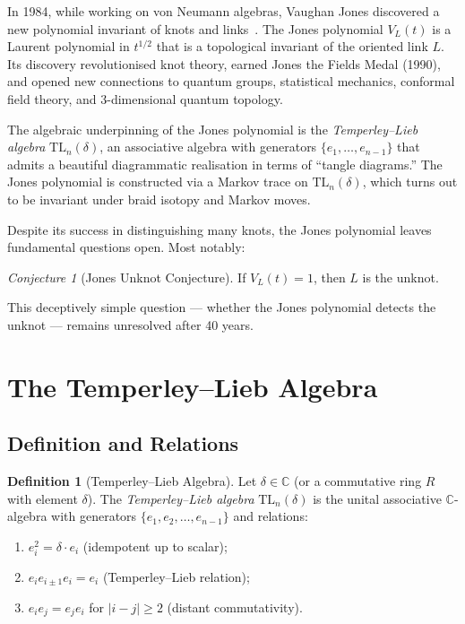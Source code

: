 \documentclass[12pt,a4paper]{amsart}
\theoremstyle{definition}
\newtheorem{definition}[theorem]{Definition}
\theoremstyle{remark}
\newtheorem{conjecture}[theorem]{Conjecture}
\begin{document}
In 1984, while working on von Neumann algebras, Vaughan Jones discovered
a new polynomial invariant of knots and links~\cite{Jones1985}. The Jones
polynomial $V_L(t)$ is a Laurent polynomial in $t^{1/2}$ that is a
topological invariant of the oriented link $L$. Its discovery revolutionised
knot theory, earned Jones the Fields Medal (1990), and opened new connections
to quantum groups, statistical mechanics, conformal field theory, and
3-dimensional quantum topology.

The algebraic underpinning of the Jones polynomial is the
\emph{Temperley--Lieb algebra} $\mathrm{TL}_n(\delta)$, an associative
algebra with generators $\{e_1, \ldots, e_{n-1}\}$ that admits a beautiful
diagrammatic realisation in terms of ``tangle diagrams.'' The Jones
polynomial is constructed via a Markov trace on $\mathrm{TL}_n(\delta)$,
which turns out to be invariant under braid isotopy and Markov moves.

Despite its success in distinguishing many knots, the Jones polynomial
leaves fundamental questions open. Most notably:

\begin{conjecture}[Jones Unknot Conjecture]
\label{conj:Jones-unknot}
If $V_L(t) = 1$, then $L$ is the unknot.
\end{conjecture}

This deceptively simple question — whether the Jones polynomial detects the
unknot — remains unresolved after 40 years.

\section{The Temperley--Lieb Algebra}

\subsection{Definition and Relations}

\begin{definition}[Temperley--Lieb Algebra]
Let $\delta \in \mathbb{C}$ (or a commutative ring $R$ with element $\delta$).
The \emph{Temperley--Lieb algebra} $\mathrm{TL}_n(\delta)$ is the unital
associative $\mathbb{C}$-algebra with generators $\{e_1, e_2, \ldots, e_{n-1}\}$
and relations:
\begin{enumerate}[label=\roman*)]
\item $e_i^2 = \delta \cdot e_i$ \hfill (idempotent up to scalar);
\item $e_i e_{i\pm 1} e_i = e_i$ \hfill (Temperley--Lieb relation);
\item $e_i e_j = e_j e_i$ for $|i-j| \geq 2$ \hfill (distant commutativity).
\end{enumerate}
\end{definition}
\end{document}
